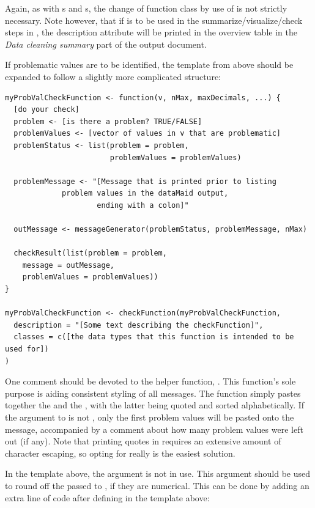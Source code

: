 \documentclass[article,shortnames]{jss}
\begin{document}
Again, as with s and s, the
change of function class by use of  is not strictly
necessary. Note however, that if  is to be
used in the summarize/visualize/check steps in , the
description attribute will be printed in the overview table in the
\textit{Data cleaning summary} part of the output document.

If problematic values are to be identified, the template from above
should be expanded to follow a slightly more complicated structure:

\begin{Verbatim}
myProbValCheckFunction <- function(v, nMax, maxDecimals, ...) {
  [do your check]
  problem <- [is there a problem? TRUE/FALSE]
  problemValues <- [vector of values in v that are problematic]
  problemStatus <- list(problem = problem,
                        problemValues = problemValues)

  problemMessage <- "[Message that is printed prior to listing
  		     problem values in the dataMaid output,
                     ending with a colon]"

  outMessage <- messageGenerator(problemStatus, problemMessage, nMax)

  checkResult(list(problem = problem,
    message = outMessage,
    problemValues = problemValues))
}

myProbValCheckFunction <- checkFunction(myProbValCheckFunction,
  description = "[Some text describing the checkFunction]",
  classes = c([the data types that this function is intended to be used for])
)
\end{Verbatim}

One comment should be devoted to the helper function,
.  This function's sole purpose is aiding
consistent styling of all  messages. The function
simply pastes together the  and the
, with the latter being quoted and sorted
alphabetically. If the  argument to  is
not , only the first  problem values will be pasted
onto the message, accompanied by a comment about how many problem
values were left out (if any).  Note that printing quotes in
 requires an extensive amount of character escaping, so
opting for  really is the easiest solution.

In the template above, the argument  is not in use. This
argument should be used to round off the  passed to
, if they are numerical.  This can be done by
adding an extra line of code after defining  in the template
above:
\end{document}
